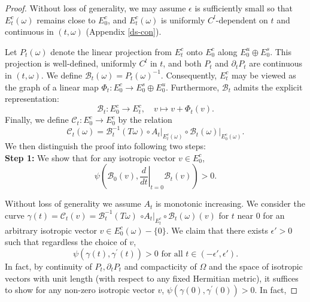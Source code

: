 \documentclass[11pt]{amsart}
\theoremstyle{remark}
\theoremstyle{definition}
\newcommand{\B}{{\mathbf B}}
\def \cC{{\mathcal{C}}}
\def \B{\mathcal{B}}
\begin{document}
	\begin{proof}
Without loss of generality, we may assume $\epsilon$ is sufficiently small so that $E_t^c(\omega)$ remains close to $E_0^c$, and $E_t^c(\omega)$ is uniformly $C^l$-dependent on $t$ and continuous in $(t,\omega)$ (Appendix \ref{ds-con}).  
 
Let $P_t(\omega)$ denote the linear projection from $E_t^c$ onto $E_0^c$ along $E_0^u \oplus E_0^s$. This projection is well-defined, uniformly $C^l$ in $t$, and both $P_t$ and $\partial_t P_t$ are continuous in $(t,\omega)$. We define $\B_t(\omega) = P_t(\omega)^{-1}$. Consequently, $E_t^c$ may be viewed as the graph of a linear map $\Phi_t: E_0^c \to E_0^s \oplus E_0^u$. Furthermore, $\B_t$ admits the explicit representation:  
\[
\B_t: E_0^c \to E_t^c,\quad v \mapsto v + \Phi_t(v).
\]  
Finally, we define $\cC_t: E_0^c \to E_0^c$ by the relation  
\[
\cC_t(\omega) = \B_t^{-1}(T\omega) \circ \left. A_t \right|_{E_t^c(\omega)} \circ \left. \B_t(\omega) \right|_{E_0^c(\omega)}.
\]
We then distinguish the proof into following two steps:\\

\textbf{Step 1:} We show that for any isotropic vector \( v \in E^c_0 \), 
\[
\psi\left( \B_0(v), \left. \frac{d}{dt} \right|_{t=0} \B_t(v) \right) > 0.
\]
   
Without loss of generality we assume $A_t$ is monotonic increasing. We consider the curve   
$\gamma(t)=\cC_t(v)=\B_t^{-1}(T\omega)$ $\left.\circ A_t\right|_{E_t^c} \circ \B_t(\omega)(v)$ for $t$ near $0$ for an arbitrary isotropic vector $v\in E^c_0(\omega)-\{0\}$. We claim that there exists $\epsilon'>0$ such that regardless the choice of $v$, 
\begin{equation*}
			\psi(\gamma(t), \gamma^{\prime}(t))>0\text { for all } t \in (-\epsilon',\epsilon').
\end{equation*}
In fact, by continuity of $P_t, \partial_t P_t$ and compacticity of $\Omega$ and the space of isotropic vectors with unit length (with respect to any fixed Hermitian metric), it suffices to show for any non-zero isotropic vector $v$, $
 \psi(\gamma(0), \gamma^{\prime}(0))>0$. In fact,   



\end{proof}
\end{document}

